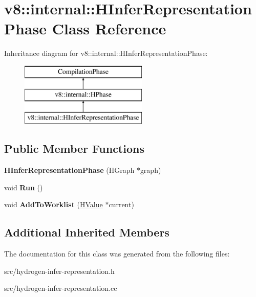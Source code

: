 \hypertarget{classv8_1_1internal_1_1_h_infer_representation_phase}{}\section{v8\+:\+:internal\+:\+:H\+Infer\+Representation\+Phase Class Reference}
\label{classv8_1_1internal_1_1_h_infer_representation_phase}
Inheritance diagram for v8\+:\+:internal\+:\+:H\+Infer\+Representation\+Phase\+:\begin{figure}[H]
\begin{center}
\leavevmode
\includegraphics[height=3.000000cm]{classv8_1_1internal_1_1_h_infer_representation_phase}
\end{center}
\end{figure}
\subsection*{Public Member Functions}
\begin{DoxyCompactItemize}
\item 
\hypertarget{classv8_1_1internal_1_1_h_infer_representation_phase_aeec58f517b7a54f65868d7a60be43746}{}{\bfseries H\+Infer\+Representation\+Phase} (H\+Graph $\ast$graph)\label{classv8_1_1internal_1_1_h_infer_representation_phase_aeec58f517b7a54f65868d7a60be43746}

\item 
\hypertarget{classv8_1_1internal_1_1_h_infer_representation_phase_a1685ed296ddec7bce7082ced23403d02}{}void {\bfseries Run} ()\label{classv8_1_1internal_1_1_h_infer_representation_phase_a1685ed296ddec7bce7082ced23403d02}

\item 
\hypertarget{classv8_1_1internal_1_1_h_infer_representation_phase_ad4a6a6199782065574ee1cfb6988d12b}{}void {\bfseries Add\+To\+Worklist} (\hyperlink{classv8_1_1internal_1_1_h_value}{H\+Value} $\ast$current)\label{classv8_1_1internal_1_1_h_infer_representation_phase_ad4a6a6199782065574ee1cfb6988d12b}

\end{DoxyCompactItemize}
\subsection*{Additional Inherited Members}


The documentation for this class was generated from the following files\+:\begin{DoxyCompactItemize}
\item 
src/hydrogen-\/infer-\/representation.\+h\item 
src/hydrogen-\/infer-\/representation.\+cc\end{DoxyCompactItemize}
